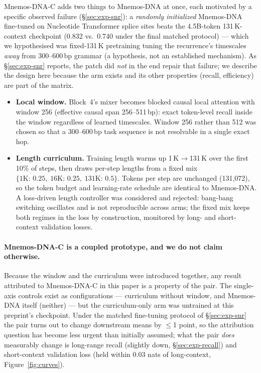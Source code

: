 \documentclass[11pt]{article}
\theoremstyle{plain}
\begin{document}
Mnemos-DNA-C adds two things to Mnemos-DNA at once, each motivated by a specific observed failure
(\S\ref{sec:exp-snr}): a \emph{randomly initialized} Mnemos-DNA fine-tuned on Nucleotide
Transformer splice sites beats the 4.5B-token 131\,K-context checkpoint (0.832 vs.\ 0.740 under
the final matched protocol) --- which we hypothesised was fixed-131\,K pretraining tuning the recurrence's
timescales \emph{away} from 300--600\,bp grammar (a hypothesis, not an established mechanism). As \S\ref{sec:exp-snr} reports, the patch did
\emph{not} in the end repair that failure; we describe the design here because the arm exists
and its other properties (recall, efficiency) are part of the matrix.

\begin{itemize}
\item \textbf{Local window.} Block~4's mixer becomes blocked causal local attention with window
256 (effective causal span 256--511\,bp): exact token-level recall inside the window regardless
of learned timescales. Window 256 rather than 512 was chosen so that a 300--600\,bp task sequence
is not resolvable in a single exact hop.
\item \textbf{Length curriculum.} Training length warms up 1\,K$\to$131\,K over the first 10\% of
steps, then draws per-step lengths from a fixed mix $\{1\text{K}{:}\,0.25,\;16\text{K}{:}\,0.25,\;
131\text{K}{:}\,0.5\}$. Tokens per step are unchanged (131{,}072), so the token budget and
learning-rate schedule are identical to Mnemos-DNA. A loss-driven length controller was considered and
rejected: bang-bang switching oscillates and is not reproducible across arms; the fixed mix keeps
both regimes in the loss by construction, monitored by long- and short-context validation losses.
\end{itemize}

\paragraph{Mnemos-DNA-C is a coupled prototype, and we do not claim otherwise.} Because the window and the
curriculum were introduced together, any result attributed to Mnemos-DNA-C in this paper is a
property of the pair. The single-axis controls exist as configurations --- curriculum without
window, and Mnemos-DNA itself (neither) --- but the curriculum-only arm was untrained at this
preprint's checkpoint. Under the matched fine-tuning protocol of \S\ref{sec:exp-snr} the pair
turns out to change downstream means by $\le$1 point, so the attribution question has become
less urgent than initially assumed; what the pair \emph{does} measurably change is
long-range recall (slightly down, \S\ref{sec:exp-recall}) and short-context validation loss
(held within 0.03 nats of long-context, Figure~\ref{fig:curves}).
\end{document}
